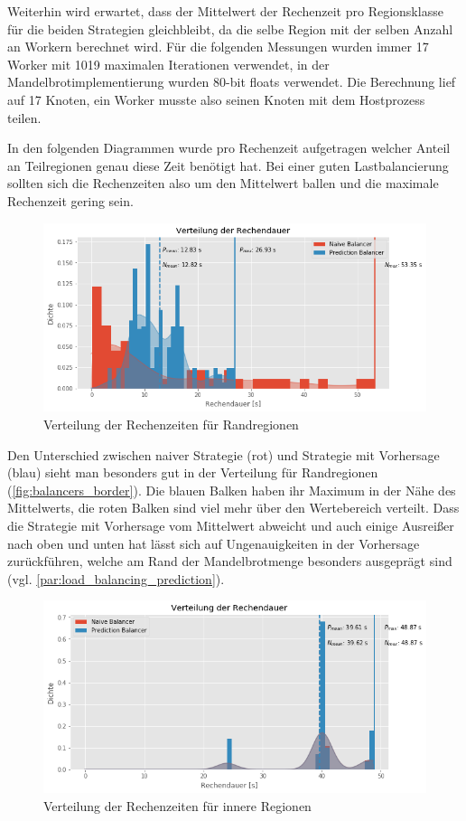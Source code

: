 Weiterhin wird erwartet, dass der Mittelwert der Rechenzeit pro Regionsklasse für die beiden Strategien gleichbleibt, da die selbe Region mit der selben Anzahl an Workern berechnet wird.
Für die folgenden Messungen wurden immer 17 Worker mit 1019 maximalen Iterationen verwendet, in der Mandelbrotimplementierung wurden 80-bit floats verwendet.
Die Berechnung lief auf 17 Knoten, ein Worker musste also seinen Knoten mit dem Hostprozess teilen.

In den folgenden Diagrammen wurde pro Rechenzeit aufgetragen welcher Anteil an Teilregionen genau diese Zeit benötigt hat.
Bei einer guten Lastbalancierung sollten sich die Rechenzeiten also um den Mittelwert ballen und die maximale Rechenzeit gering sein.

\begin{figure}
	\centering
	\includegraphics[width=0.9\linewidth]{img/Evaluation/balancers/balancers_border.png}
	\caption{Verteilung der Rechenzeiten für Randregionen}
	\label{fig:balancers_border}
\end{figure}

Den Unterschied zwischen naiver Strategie (rot) und Strategie mit Vorhersage (blau) sieht man besonders gut in der Verteilung für Randregionen (\autoref{fig:balancers_border}).
Die blauen Balken haben ihr Maximum in der Nähe des Mittelwerts, die roten Balken sind viel mehr über den Wertebereich verteilt.
Dass die Strategie mit Vorhersage vom Mittelwert abweicht und auch einige Ausreißer nach oben und unten hat lässt sich auf Ungenauigkeiten in der Vorhersage zurückführen, welche am Rand der Mandelbrotmenge besonders ausgeprägt sind (vgl. \autoref{par:load_balancing_prediction}).

\begin{figure}
	\centering
	\includegraphics[width=0.9\linewidth]{img/Evaluation/balancers/balancers_inside.png}
	\caption{Verteilung der Rechenzeiten für innere Regionen}
	\label{fig:balancers_inside}
\end{figure}

